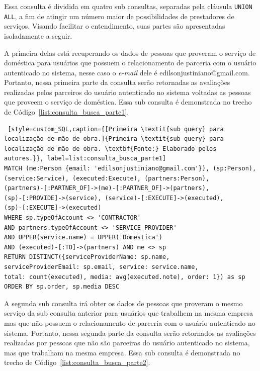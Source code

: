 Essa consulta é dividida em quatro sub consultas, separadas pela cláusula \texttt{UNION ALL}, a fim de atingir um número maior de possibilidades de prestadores de serviços. Visando facilitar o entendimento, suas partes são apresentadas isoladamente a seguir.

A primeira delas está recuperando os dados de pessoas que proveram o serviço de doméstica para usuários que possuem o relacionamento de parceria com o usuário autenticado no sistema, nesse caso o \textit{e-mail} dele é edilsonjustiniano@gmail.com. Portanto, nessa primeira parte da consulta serão retornadas as avaliações realizadas pelos parceiros do usuário autenticado no sistema voltadas as pessoas que proveem o serviço de doméstica. Essa sub consulta é demonstrada no trecho de Código~\ref{list:consulta_busca_parte1}.

\begin{lstlisting} [style=custom_SQL,caption={[Primeira \textit{sub query} para localização de mão de obra.]{Primeira \textit{sub query} para localização de mão de obra. \textbf{Fonte:} Elaborado pelos autores.}}, label=list:consulta_busca_parte1] 	
MATCH (me:Person {email: 'edilsonjustiniano@gmail.com'}), (sp:Person), 
(service:Service), (executed:Execute), (partners:Person), 
(partners)-[:PARTNER_OF]->(me)-[:PARTNER_OF]->(partners),
(sp)-[:PROVIDE]->(service), (service)-[:EXECUTE]->(executed),
(sp)-[:EXECUTE]->(executed)
WHERE sp.typeOfAccount <> 'CONTRACTOR' 
AND partners.typeOfAccount <> 'SERVICE_PROVIDER'
AND UPPER(service.name) = UPPER('Domestica')
AND (executed)-[:TO]->(partners) AND me <> sp
RETURN DISTINCT({serviceProviderName: sp.name, 
serviceProviderEmail: sp.email, service: service.name,
total: count(executed), media: avg(executed.note), order: 1}) as sp 
ORDER BY sp.order, sp.media DESC
\end{lstlisting}

A segunda sub consulta irá obter os dados de pessoas que proveram o mesmo serviço da sub consulta anterior para usuários que trabalhem na mesma empresa mas que não possuem o relacionamento de parceria com o usuário autenticado no sistema. Portanto, nessa segunda parte da consulta serão retornados as avaliações realizadas por pessoas que não são parceiras do usuário autenticado no sistema, mas que trabalham na mesma empresa. Essa sub consulta é demonstrada no trecho de Código~\ref{list:consulta_busca_parte2}.

